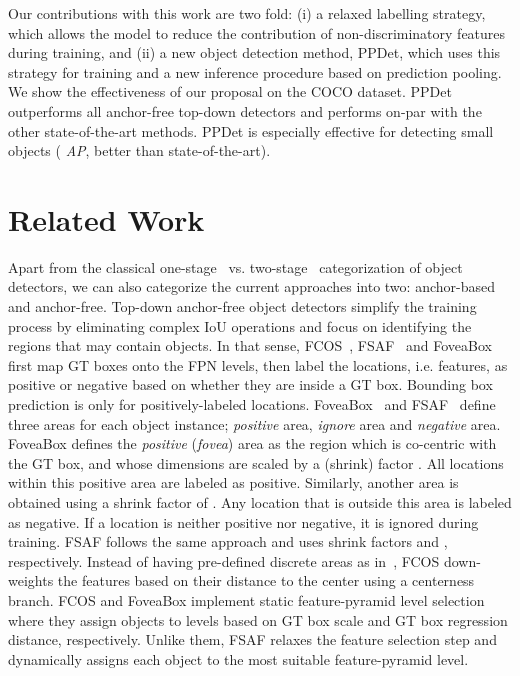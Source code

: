 \documentclass{bmvc2k}
\begin{document}
Our contributions with this work are two fold: (i) a relaxed labelling strategy, which allows the model to reduce the contribution of non-discriminatory features during training, and (ii) a new object detection method, PPDet, which uses this strategy for training and a new inference procedure based on prediction pooling.  We show the effectiveness of our proposal on the COCO dataset. PPDet outperforms all anchor-free top-down detectors and performs on-par with the other state-of-the-art methods. PPDet is especially effective for detecting small objects ( \textit{AP}, better than state-of-the-art). 


\section{Related Work}


Apart from the classical one-stage~\cite{ssd, yolo3, retinanet, dssd} vs. two-stage~\cite{ faster, fastrcnn, rfcn} categorization of object detectors, we can also categorize the current approaches into two: anchor-based and anchor-free. Top-down anchor-free object detectors simplify the training process by eliminating complex IoU operations and focus on identifying the regions that may contain objects. In that sense, FCOS~\cite{fcos}, FSAF~\cite{fsaf} and  FoveaBox~\cite{foveabox} first map GT boxes onto the FPN levels, then label the locations, i.e. features, as positive or negative based on whether they are inside a  GT box. Bounding box prediction is only for positively-labeled locations. FoveaBox~\cite{foveabox} and  FSAF~\cite{fsaf} define three areas for each object instance; \textit{positive} area, \textit{ignore} area and \textit{negative} area.  FoveaBox defines the \textit{positive} (\textit{fovea}) area as the region which is co-centric with the GT box, and whose dimensions are scaled by  a  (shrink) factor . All locations within this positive area are labeled as positive. Similarly, another  area is obtained using a  shrink factor of . Any location that is outside this area is  labeled  as negative. If a location  is neither positive nor negative, it is ignored during training.  FSAF follows the same approach and uses shrink factors  and , respectively. 
Instead of having pre-defined discrete areas as in~\cite{fsaf, foveabox, guided}, FCOS down-weights the features based on their distance  to the center using a centerness branch. FCOS and FoveaBox implement static feature-pyramid level selection where they assign objects to levels based on GT box scale and GT box regression distance, respectively. Unlike them, FSAF relaxes the feature selection step and dynamically assigns each object to the most suitable feature-pyramid level. 
  
\end{document}
